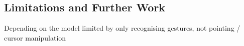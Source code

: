 



\subsection{Limitations and Further Work} %





Depending on the model limited by only recognising gestures, not pointing / cursor manipulation


